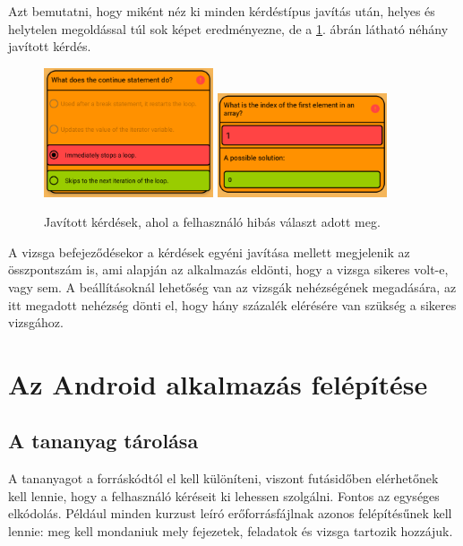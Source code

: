 \documentclass[12pt,a4paper]{article}
\begin{document}
	Azt bemutatni, hogy miként néz ki minden kérdéstípus javítás után, helyes és helytelen megoldással túl sok képet eredményezne, de a \ref{corrected_questions}. ábrán látható néhány javított kérdés.
	
	\begin{figure}[h!]
		\centering
		\includegraphics[width=5cm]{corrected_question_1}
		\includegraphics[width=5cm]{corrected_question_2}
		\caption{Javított kérdések, ahol a felhasználó hibás választ adott meg.}
		\label{corrected_questions}
	\end{figure}
	
	A vizsga befejeződésekor a kérdések egyéni javítása mellett megjelenik az összpontszám is, ami alapján az alkalmazás eldönti, hogy a vizsga sikeres volt-e, vagy sem. A beállításoknál lehetőség van az vizsgák nehézségének megadására, az itt megadott nehézség dönti el, hogy hány százalék elérésére van szükség a sikeres vizsgához.
	
	\section{Az Android alkalmazás felépítése}\label{android_alk_felepites}
	
	
	\subsection{A tananyag tárolása}\label{tananyag_tarolasa}
	
	A tananyagot a forráskódtól el kell különíteni, viszont futásidőben elérhetőnek kell lennie, hogy a felhasználó kéréseit ki lehessen szolgálni. Fontos az egységes elkódolás. Például minden kurzust leíró erőforrásfájlnak azonos felépítésűnek kell lennie: meg kell mondaniuk mely fejezetek, feladatok és vizsga tartozik hozzájuk.
	
\end{document}
